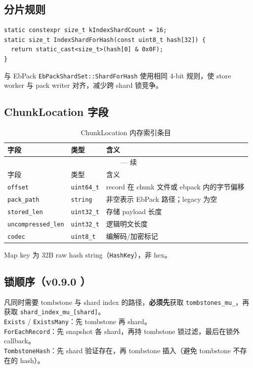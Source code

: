\subsection{分片规则}

\begin{lstlisting}[caption={Index shard 选择},label={lst:index-shard}]
static constexpr size_t kIndexShardCount = 16;
static size_t IndexShardForHash(const uint8_t hash[32]) {
  return static_cast<size_t>(hash[0] & 0x0F);
}
\end{lstlisting}

与 EbPack \texttt{EbPackShardSet::ShardForHash} 使用相同 4-bit 规则，使 store worker 与 pack writer 对齐，减少跨 shard 锁竞争。

\subsection{ChunkLocation 字段}

\begin{longtable}{@{}llp{8cm}@{}}
\caption{ChunkLocation 内存索引条目} \\
\toprule
字段 & 类型 & 含义 \\
\midrule
\endfirsthead
\multicolumn{3}{c}{\tablename\ \thetable{} — 续} \\
\toprule
字段 & 类型 & 含义 \\
\midrule
\endhead
\texttt{offset} & \texttt{uint64\_t} & record 在 chunk 文件或 ebpack 内的字节偏移 \\
\texttt{pack\_path} & \texttt{string} & 非空表示 EbPack 路径；legacy 为空 \\
\texttt{stored\_len} & \texttt{uint32\_t} & 存储 payload 长度 \\
\texttt{uncompressed\_len} & \texttt{uint32\_t} & 逻辑明文长度 \\
\texttt{codec} & \texttt{uint8\_t} & 编解码/加密标记 \\
\bottomrule
\end{longtable}

Map key 为 32B raw hash string（\texttt{HashKey}），非 hex。

\subsection{锁顺序（v0.9.0 ）}

\begin{invariantbox}
凡同时需要 tombstone 与 shard index 的路径，\textbf{必须先}获取 \texttt{tombstones\_mu\_}，再获取 \texttt{shard\_index\_mu\_[shard]}。\\
\texttt{Exists} / \texttt{ExistsMany}：先 tombstone 再 shard。\\
\texttt{ForEachRecord}：先 snapshot 各 shard，再持 tombstone 锁过滤，最后在锁外 callback。\\
\texttt{TombstoneHash}：先 shard 验证存在，再 tombstone 插入（避免 tombstone 不存在的 hash）。
\end{invariantbox}

